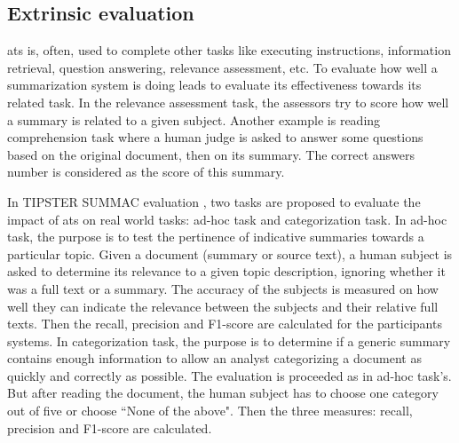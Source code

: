 \subsection{Extrinsic evaluation}

\ac{ats} is, often, used to complete other tasks like executing instructions, information retrieval, question answering, relevance assessment, etc. 
To evaluate how well a summarization system is doing leads to evaluate its effectiveness towards its related task. 
In the relevance assessment task, the assessors try to score how well a summary is related to a given subject.
Another example is reading comprehension task where a human judge is asked to answer some questions based on the original document, then on its summary.
The correct answers number is considered as the score of this summary.

In TIPSTER SUMMAC evaluation \citep{99-mani-al}, two tasks are proposed to evaluate the impact of \ac{ats} on real world tasks: ad-hoc task and categorization task. 
In ad-hoc task, the purpose is to test the pertinence of indicative summaries towards a particular topic.
Given a document (summary or source text), a human subject is asked to determine its relevance to a given topic description, ignoring whether it was a full text or a summary.
The accuracy of the subjects is measured on how well they can indicate the relevance between the subjects and their relative full texts. 
Then the recall, precision and F1-score are calculated for the participants systems. 
In categorization task, the purpose is to determine if a generic summary contains enough information to allow an analyst categorizing a document as quickly and correctly as possible. 
The evaluation is proceeded as in ad-hoc task's.
But after reading the document, the human subject has to choose one category out of five or choose ``None of the above". 
Then the three measures: recall, precision and F1-score are calculated.


